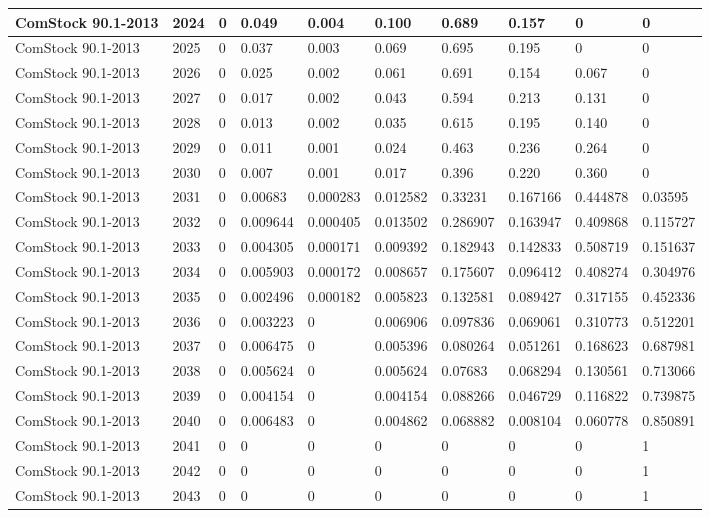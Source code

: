 \begin{table}
\begin{tabular}{|l|l|l|l|l|l|l|l|l|l|}
ComStock 90.1-2013 & 2024      & 0 & 0.049 & 0.004 & 0.100     & 0.689    & 0.157    & 0        & 0        \\ \hline
ComStock 90.1-2013 & 2025      & 0 & 0.037 & 0.003 & 0.069     & 0.695    & 0.195    & 0        & 0        \\ \hline
ComStock 90.1-2013 & 2026      & 0 & 0.025 & 0.002 & 0.061     & 0.691    & 0.154    & 0.067    & 0        \\ \hline
ComStock 90.1-2013 & 2027      & 0 & 0.017 & 0.002 & 0.043     & 0.594    & 0.213    & 0.131    & 0        \\ \hline
ComStock 90.1-2013 & 2028      & 0 & 0.013 & 0.002 & 0.035     & 0.615    & 0.195    & 0.140    & 0        \\ \hline
ComStock 90.1-2013 & 2029      & 0 & 0.011 & 0.001 & 0.024     & 0.463    & 0.236    & 0.264    & 0        \\ \hline
ComStock 90.1-2013 & 2030      & 0 & 0.007 & 0.001 & 0.017     & 0.396    & 0.220    & 0.360    & 0        \\ \hline    
ComStock 90.1-2013 & 2031 & 0 & 0.00683  & 0.000283 & 0.012582 & 0.33231  & 0.167166 & 0.444878 & 0.03595  \\ \hline
ComStock 90.1-2013 & 2032 & 0 & 0.009644 & 0.000405 & 0.013502 & 0.286907 & 0.163947 & 0.409868 & 0.115727 \\ \hline
ComStock 90.1-2013 & 2033 & 0 & 0.004305 & 0.000171 & 0.009392 & 0.182943 & 0.142833 & 0.508719 & 0.151637 \\ \hline
ComStock 90.1-2013 & 2034 & 0 & 0.005903 & 0.000172 & 0.008657 & 0.175607 & 0.096412 & 0.408274 & 0.304976 \\ \hline
ComStock 90.1-2013 & 2035 & 0 & 0.002496 & 0.000182 & 0.005823 & 0.132581 & 0.089427 & 0.317155 & 0.452336 \\ \hline
ComStock 90.1-2013 & 2036 & 0 & 0.003223 & 0        & 0.006906 & 0.097836 & 0.069061 & 0.310773 & 0.512201 \\ \hline
ComStock 90.1-2013 & 2037 & 0 & 0.006475 & 0        & 0.005396 & 0.080264 & 0.051261 & 0.168623 & 0.687981 \\ \hline
ComStock 90.1-2013 & 2038 & 0 & 0.005624 & 0        & 0.005624 & 0.07683  & 0.068294 & 0.130561 & 0.713066 \\ \hline
ComStock 90.1-2013 & 2039 & 0 & 0.004154 & 0        & 0.004154 & 0.088266 & 0.046729 & 0.116822 & 0.739875 \\ \hline
ComStock 90.1-2013 & 2040 & 0 & 0.006483 & 0        & 0.004862 & 0.068882 & 0.008104 & 0.060778 & 0.850891 \\ \hline
ComStock 90.1-2013 & 2041 & 0 & 0        & 0        & 0        & 0        & 0        & 0        & 1        \\ \hline
ComStock 90.1-2013 & 2042 & 0 & 0        & 0        & 0        & 0        & 0        & 0        & 1        \\ \hline
ComStock 90.1-2013 & 2043 & 0 & 0        & 0        & 0        & 0        & 0        & 0        & 1        \\ \hline

\end{tabular}
\end{table}